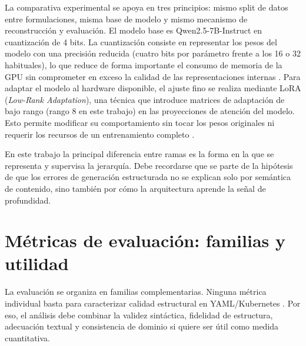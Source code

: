 La comparativa experimental se apoya en tres principios: mismo split de datos entre formulaciones, misma base de modelo y mismo mecanismo de
reconstrucción y evaluación. El modelo base es Qwen2.5-7B-Instruct \citep{qwen2024qwen25} en cuantización de 4 bits. La cuantización consiste en representar los pesos
del modelo con una precisión reducida (cuatro bits por parámetro frente a los 16 o 32 habituales), lo que reduce de forma
importante el consumo de memoria de la GPU sin comprometer en exceso la calidad de las representaciones internas \citep{dettmers2023qlora}. Para adaptar el modelo al 
hardware disponible, el ajuste fino se
realiza mediante LoRA (\textit{Low-Rank Adaptation}), una técnica que introduce matrices de adaptación de bajo rango (rango 8 en este
trabajo) en las proyecciones de atención del modelo. Esto permite modificar su comportamiento sin tocar los pesos originales ni requerir los
recursos de un entrenamiento completo \citep{hu2021lora}.

En este trabajo la principal diferencia entre ramas es la forma en la que se representa y
supervisa la jerarquía. Debe recordarse que se parte de la hipótesis de que los errores de generación estructurada no se explican solo
por semántica de contenido, sino también por cómo la arquitectura aprende la señal de profundidad.

\section{Métricas de evaluación: familias y utilidad}
\label{sec:ch4_metrics}

La evaluación se organiza en familias complementarias. Ninguna métrica individual basta para caracterizar calidad estructural en YAML/Kubernetes \citep{chen2021evaluating, yang2025structeval, xu2024cloudevalyaml}. Por eso, el
análisis debe combinar la validez sintáctica, fidelidad de estructura, adecuación textual y consistencia de dominio si quiere ser útil como medida cuantitativa.

